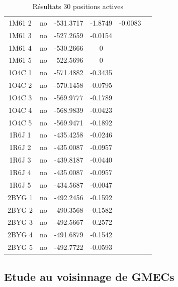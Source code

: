 \documentclass[a4paper,12pt]{article}
\begin{document}
\begin{table}[h]
\begin{tabular}{|c|c|c|c|c|c|}
        1M61 2 & no & -531.3717 & -1.8749 & -0.0083 \\
        1M61 3 & no & -527.2659 & -0.0154 & \\
        1M61 4 & no & -530.2666 & 0 & \\
        1M61 5 & no & -522.5696 & 0 & \\
        1O4C 1 & no & -571.4882 & -0.3435 &  \\
        1O4C 2 & no & -570.1458 & -0.0795 &  \\
        1O4C 3 & no & -569.9777 & -0.1789 &  \\
        1O4C 4 & no & -568.9839 & -0.0423 &  \\
        1O4C 5 & no & -569.9471 & -0.1892 &  \\
        1R6J 1 & no & -435.4258 & -0.0246 &  \\
        1R6J 2 & no & -435.0087 & -0.0957 &  \\
        1R6J 3 & no & -439.8187 & -0.0440 &  \\
        1R6J 4 & no & -435.0087 & -0.0957 &  \\
        1R6J 5 & no & -434.5687 & -0.0047 &  \\
        2BYG 1 & no & -492.2456 & -0.1592 &  \\
        2BYG 2 & no & -490.3568 & -0.1582 &  \\
        2BYG 3 & no & -492.5667 & -0.2572 &  \\
        2BYG 4 & no & -491.6879 & -0.1542 &  \\
        2BYG 5 & no & -492.7722 & -0.0593 &  \\
        \hline


 \end{tabular}      
 \caption{Résultats 30 positions actives }
 \label{tab_echec2BYG__1}      
\end{table}


   \subsection{ Etude au voisinnage de GMECs}
\end{document}
